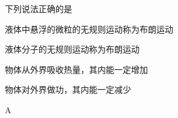 下列说法正确的是\paren[]
\begin{choices}
    \item 液体中悬浮的微粒的无规则运动称为布朗运动
    \item 液体分子的无规则运动称为布朗运动
    \item 物体从外界吸收热量，其内能一定增加
    \item 物体对外界做功，其内能一定减少
\end{choices}
\begin{answer}
    A
\end{answer}